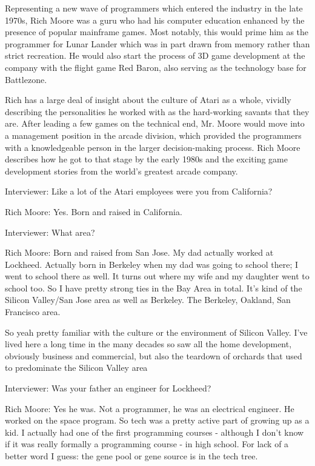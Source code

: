 Representing a new wave of programmers which entered the industry in the late 1970s, Rich Moore was a guru who had his computer education enhanced by the presence of popular mainframe games. Most notably, this would prime him as the programmer for Lunar Lander which was in part drawn from memory rather than strict recreation. He would also start the process of 3D game development at the company with the flight game Red Baron, also serving as the technology base for Battlezone.

Rich has a large deal of insight about the culture of Atari as a whole, vividly describing the personalities he worked with as the hard-working savants that they are. After leading a few games on the technical end, Mr. Moore would move into a management position in the arcade division, which provided the programmers with a knowledgeable person in the larger decision-making process. Rich Moore describes how he got to that stage by the early 1980s and the exciting game development stories from the world’s greatest arcade company.

\noindent\makebox[\linewidth]{\rule{\paperwidth}{0.4pt}}

\textcolor{interviewer}{Interviewer:} Like a lot of the Atari employees were you from California?

Rich Moore: Yes. Born and raised in California.

\textcolor{interviewer}{Interviewer:} What area?

Rich Moore: Born and raised from San Jose. My dad actually worked at Lockheed. Actually born in Berkeley when my dad was going to school there; I went to school there as well. It turns out where my wife and my daughter went to school too. So I have pretty strong ties in the Bay Area in total. It's kind of the Silicon Valley/San Jose area as well as Berkeley. The Berkeley, Oakland, San Francisco area.

So yeah pretty familiar with the culture or the environment of Silicon Valley. I’ve lived here a long time in the many decades so saw all the home development, obviously business and commercial, but also the teardown of orchards that used to predominate the Silicon Valley area

\textcolor{interviewer}{Interviewer:} Was your father an engineer for Lockheed?

\textcolor{interviewee}{Rich Moore:} Yes he was. Not a programmer, he was an electrical engineer. He worked on the space program. So tech was a pretty active part of growing up as a kid. I actually had one of the first programming courses - although I don’t know if it was really formally a programming course - in high school. For lack of a better word I guess: the gene pool or gene source is in the tech tree.

